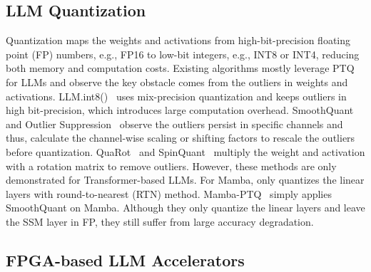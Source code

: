 \subsection{LLM Quantization}
Quantization maps the weights and activations from high-bit-precision floating point (FP) numbers,
e.g., FP16 to low-bit integers, e.g., INT8 or INT4,
reducing both memory and computation costs.
Existing algorithms mostly leverage PTQ for LLMs and observe
the key obstacle comes from the outliers in weights and activations.
LLM.int8()~\cite{dettmers2022llm} uses mix-precision quantization and
keeps outliers in high bit-precision,
which introduces large computation overhead.
SmoothQuant~\cite{xiao2023smoothquant} and 
Outlier Suppression~\cite{wei2022outlier,wei2023outlier} observe the outliers persist
in specific channels and thus, calculate 
the channel-wise scaling or shifting factors to rescale the outliers before quantization.
QuaRot~\cite{ashkboos2024quarot} and SpinQuant~\cite{liu2024spinquant}
multiply the weight and activation with a rotation matrix 
to remove outliers.
However, these methods are only demonstrated for Transformer-based LLMs.
For Mamba, \cite{li2024evaluating} only quantizes the linear layers with round-to-nearest (RTN) method. 
Mamba-PTQ~\cite{pierro2024mamba} simply applies SmoothQuant on Mamba.
Although they only quantize the linear layers and leave the SSM layer in FP, they still
suffer from large accuracy degradation.


\subsection{FPGA-based LLM Accelerators}

